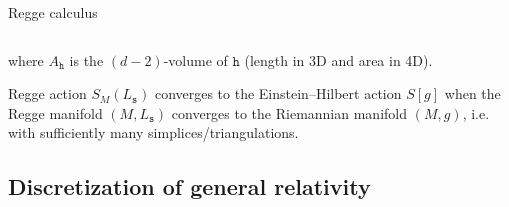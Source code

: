 \documentclass{beamer}
\begin{document}
\begin{frame}{Regge calculus}
\begin{list}{\maltese}{\leftmargin=1em \itemindent=0em}
\begin{minipage}{\linewidth}
\begin{columns}
            \end{columns}
            where $A_\mathtt{h}$ is the $(d-2)$-volume of $\mathtt{h}$ (length in 3D and area in 4D).
        \end{minipage}
        \item<2->[] \hfill
        \item<3-> Regge action $S_M(L_\mathtt{s})$ converges to the Einstein–Hilbert action $S[g]$ when the Regge manifold $(M,L_\mathtt{s})$ converges to the Riemannian manifold $(M,g)$, i.e. with sufficiently many simplices/triangulations.
    \end{list}
\end{frame}

\subsection{Discretization of general relativity}
\end{document}
